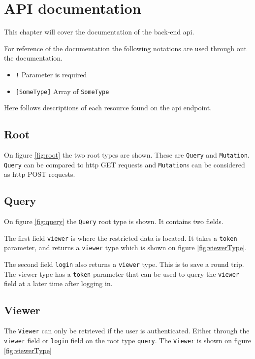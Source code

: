 \chapter{API documentation}
This chapter will cover the documentation of the back-end \gls{api}.

For reference of the  documentation \citep{graphql:typesystem} the following notations are used through out the documentation.

\begin{itemize}  
\item \verb+!+ Parameter is required
\item \verb+[SomeType]+ Array of \verb+SomeType+
\end{itemize}

Here follows descriptions of each resource found on the \gls{api} endpoint.

\section{Root}
On figure \ref{fig:root} the two root types are shown. 
These are \verb+Query+ and \verb+Mutation+. 
\verb+Query+ can be compared to \gls{http} GET requests and \verb+Mutation+s can be considered as \gls{http} POST requests.

\section{Query}
On figure \ref{fig:query} the \verb+Query+ root type is shown. It contains two fields. 

The first field \verb+viewer+ is where the restricted data is located.
It takes a \verb+token+ parameter, and returns a \verb+viewer+ type which is shown on figure \ref{fig:viewerType}.

The second field \verb+login+ also returns a \verb+viewer+ type. 
This is to save a round trip.
The viewer type has a \verb+token+ parameter that can be used to query the \verb+viewer+ field at a later time after logging in.

\section{Viewer}
The \verb+Viewer+ can only be retrieved if the user is authenticated. 
Either through the \verb+viewer+ field or \verb+login+ field on the root type \verb+query+. The \verb+Viewer+ is shown on figure \ref{fig:viewerType}


